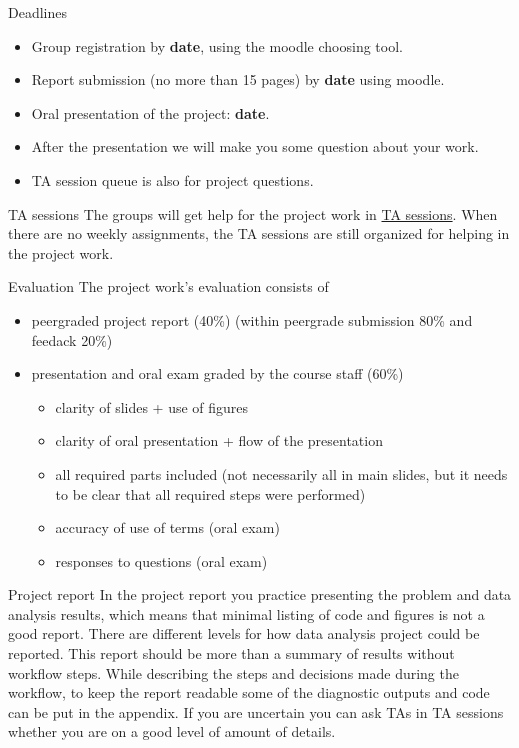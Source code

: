 \documentclass[
  13pt,
  ignorenonframetext,
]{beamer}
\providecommand{\tightlist}{%
  \setlength{\itemsep}{0pt}\setlength{\parskip}{0pt}}
\begin{document}
\begin{frame}[fragile]{Deadlines}
\protect\hypertarget{deadlines}{}
\begin{itemize}
\item
  Group registration by \textbf{date}, using the moodle choosing tool.
\item
  Report submission (no more than 15 pages) by \textbf{date} using
  moodle.
\item
  Oral presentation of the project: \textbf{date}.
\item
  After the presentation we will make you some question about your work.
\item
  TA session queue is also for project questions.
\end{itemize}

\begin{block}{TA sessions}
\protect\hypertarget{ta-sessions}{}
The groups will get help for the project work in
\href{assignments.html\#TA_sessions}{TA sessions}. When there are no
weekly assignments, the TA sessions are still organized for helping in
the project work.
\end{block}

\begin{block}{Evaluation}
\protect\hypertarget{evaluation-1}{}
The project work's evaluation consists of

\begin{itemize}
\tightlist
\item
  peergraded project report (40\%) (within peergrade submission 80\% and
  feedack 20\%)
\item
  presentation and oral exam graded by the course staff (60\%)

  \begin{itemize}
  \tightlist
  \item
    clarity of slides + use of figures
  \item
    clarity of oral presentation + flow of the presentation
  \item
    all required parts included (not necessarily all in main slides, but
    it needs to be clear that all required steps were performed)
  \item
    accuracy of use of terms (oral exam)
  \item
    responses to questions (oral exam)
  \end{itemize}
\end{itemize}
\end{block}

\begin{block}{Project report}
\protect\hypertarget{project-report}{}
In the project report you practice presenting the problem and data
analysis results, which means that minimal listing of code and figures
is not a good report. There are different levels for how data analysis
project could be reported. This report should be more than a summary of
results without workflow steps. While describing the steps and decisions
made during the workflow, to keep the report readable some of the
diagnostic outputs and code can be put in the appendix. If you are
uncertain you can ask TAs in TA sessions whether you are on a good level
of amount of details.


\end{block}
\end{frame}
\end{document}
